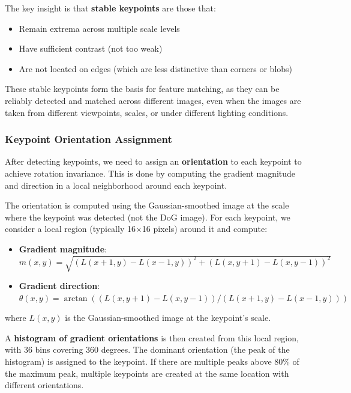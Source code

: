 \documentclass[11pt,a4paper]{article}
\theoremstyle{definition}
\theoremstyle{plain}
\theoremstyle{remark}
\begin{document}
The key insight is that \textbf{stable keypoints} are those that:
\begin{itemize}
    \item Remain extrema across multiple scale levels
    \item Have sufficient contrast (not too weak)
    \item Are not located on edges (which are less distinctive than corners or blobs)
\end{itemize}

These stable keypoints form the basis for feature matching, as they can be reliably detected and matched across different images, even when the images are taken from different viewpoints, scales, or under different lighting conditions.

\subsubsection{Keypoint Orientation Assignment}

After detecting keypoints, we need to assign an \textbf{orientation} to each keypoint to achieve rotation invariance. This is done by computing the gradient magnitude and direction in a local neighborhood around each keypoint.

The orientation is computed using the Gaussian-smoothed image at the scale where the keypoint was detected (not the DoG image). For each keypoint, we consider a local region (typically 16×16 pixels) around it and compute:

\begin{itemize}
    \item \textbf{Gradient magnitude}: $m(x, y) = \sqrt{(L(x+1, y) - L(x-1, y))^2 + (L(x, y+1) - L(x, y-1))^2}$
    \item \textbf{Gradient direction}: $\theta(x, y) = \arctan((L(x, y+1) - L(x, y-1)) / (L(x+1, y) - L(x-1, y)))$
\end{itemize}

where $L(x, y)$ is the Gaussian-smoothed image at the keypoint's scale.

A \textbf{histogram of gradient orientations} is then created from this local region, with 36 bins covering 360 degrees. The dominant orientation (the peak of the histogram) is assigned to the keypoint. If there are multiple peaks above 80\% of the maximum peak, multiple keypoints are created at the same location with different orientations.
\end{document}
